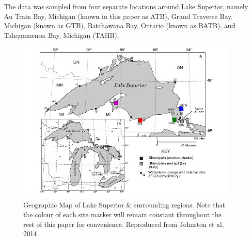 \documentclass{article}
\begin{document}
\newpage 
 
 The data was sampled from four separate locations around Lake Superior, namely
 Au Train Bay, Michigan (known in this paper as ATB), Grand Traverse Bay,
 Michigan (known as GTB), Batchawana Bay, Ontario (known as BATB), and 
 Tahquamenon Bay, Michigan (TAHB).\\
 \begin{figure}[h]
	\includegraphics[width=0.8\linewidth]{johnstonLaurentianMapWithSites.png}
	\caption{Geographic Map of Lake Superior \& surrounding regions. Note that
	 the colour of each site marker will remain constant throughout the rest of
	 this paper for convenience. Reproduced from Johnston et al, 2014}
	\label{fig:johnstonLaurentianMapWithSites}
 \end{figure}
\end{document}
